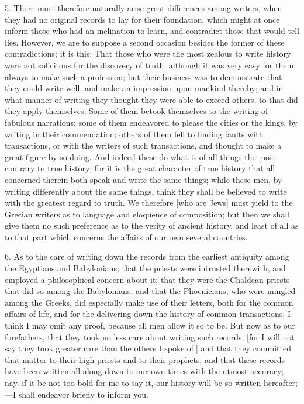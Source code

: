 5. There must therefore naturally arise great differences among writers,
when they had no original records to lay for their foundation, which might
at once inform those who had an inclination to learn, and contradict those
that would tell lies. However, we are to suppose a second occasion besides
the former of these contradictions; it is this: That those who were the
most zealous to write history were not solicitous for the discovery of
truth, although it was very easy for them always to make such a
profession; but their business was to demonstrate that they could write
well, and make an impression upon mankind thereby; and in what manner of
writing they thought they were able to exceed others, to that did they
apply themselves, Some of them betook themselves to the writing of
fabulous narrations; some of them endeavored to please the cities or the
kings, by writing in their commendation; others of them fell to finding
faults with transactions, or with the writers of such transactions, and
thought to make a great figure by so doing. And indeed these do what is of
all things the most contrary to true history; for it is the great
character of true history that all concerned therein both speak and write
the same things; while these men, by writing differently about the same
things, think they shall be believed to write with the greatest regard to
truth. We therefore [who are Jews] must yield to the Grecian writers as to
language and eloquence of composition; but then we shall give them no such
preference as to the verity of ancient history, and least of all as to
that part which concerns the affairs of our own several countries.

6. As to the care of writing down the records from the earliest antiquity
among the Egyptians and Babylonians; that the priests were intrusted
therewith, and employed a philosophical concern about it; that they were
the Chaldean priests that did so among the Babylonians; and that the
Phoenicians, who were mingled among the Greeks, did especially make use of
their letters, both for the common affairs of life, and for the delivering
down the history of common transactions, I think I may omit any proof,
because all men allow it so to be. But now as to our forefathers, that
they took no less care about writing such records, [for I will not say
they took greater care than the others I spoke of,] and that they
committed that matter to their high priests and to their prophets, and
that these records have been written all along down to our own times with
the utmost accuracy; nay, if it be not too bold for me to say it, our
history will be so written hereafter;—I shall endeavor briefly to
inform you.

